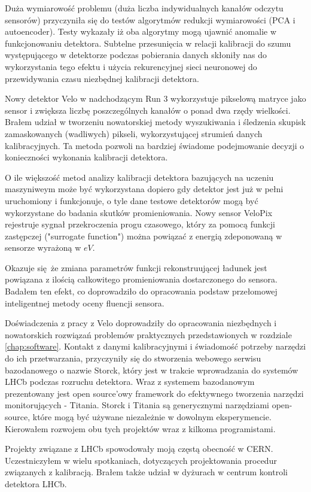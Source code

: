 Duża wymiarowość problemu (duża liczba indywidualnych kanałów odczytu sensorów) przyczyniła się do testów algorytmów redukcji wymiarowości (PCA i autoencoder). Testy wykazały iż oba algorytmy mogą ujawnić anomalie w funkcjonowaniu detektora.
Subtelne przesunięcia w relacji kalibracji do szumu występującego w detektorze podczas pobierania danych skłoniły nas do wykorzystania tego efektu i użycia rekurencyjnej sieci neuronowej do przewidywania czasu niezbędnej kalibracji detektora.

Nowy detektor Velo w nadchodzącym Run 3 wykorzystuje pikselową matryce jako sensor i zwiększa liczbę poszczególnych kanałów o ponad dwa rzędy wielkości.
Brałem udział w tworzeniu nowatorskiej metody wyszukiwania i śledzenia skupisk zamaskowanych (wadliwych) pikseli, wykorzystującej strumień danych kalibracyjnych. Ta metoda pozwoli na bardziej świadome podejmowanie decyzji o konieczności wykonania kalibracji detektora.

O ile większość metod analizy kalibracji detektora bazujących na uczeniu maszyniweym może być wykorzystana dopiero gdy detektor jest już w pełni uruchomiony i funkcjonuje, o tyle dane testowe detektorów mogą być wykorzystane do badania skutków promieniowania.
Nowy sensor VeloPix rejestruje sygnał przekroczenia progu czasowego, który za pomocą funkcji zastępczej ("surrogate function") można powiązać z energią zdeponowaną w sensorze wyrażoną w $eV$. 

Okazuje się że zmiana parametrów funkcji rekonstruującej ładunek jest powiązana z ilością całkowitego promieniowania dostarczonego do sensora. Badałem ten efekt, co doprowadziło do opracowania podstaw przełomowej inteligentnej metody oceny fluencji sensora.


Doświadczenia z pracy z Velo doprowadziły do opracowania niezbędnych i nowatorskich rozwiązań problemów praktycznych przedstawionych w rozdziale  \ref{chap:software}.
Kontakt z danymi kalibracyjnymi i świadomość potrzeby narzędzi do ich przetwarzania, przyczyniły się do stworzenia webowego serwisu bazodanowego o nazwie Storck, który jest w trakcie wprowadzania do systemów LHCb podczas rozruchu detektora.
Wraz z systemem bazodanowym prezentowany jest open source'owy framework do efektywnego tworzenia narzędzi monitorujących - Titania.
Storck i Titania są generycznymi narzędziami open-source, które mogą być używane niezależnie w dowolnym eksperymencie.
Kierowałem rozwojem obu tych projektów wraz z kilkoma programistami.

Projekty związane z LHCb spowodowały moją częstą obecność w CERN. 
Uczestniczyłem w wielu spotkaniach, dotyczących projektowania procedur związanych z kalibracją.
Brałem także udział w dyżurach w centrum kontroli detektora LHCb.

